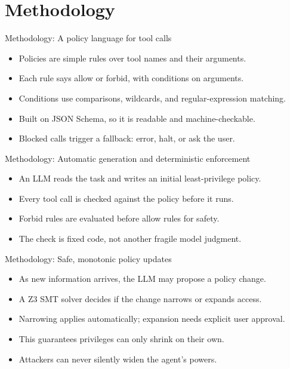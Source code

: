 \documentclass[10pt]{beamer}
\begin{document}
\section{Methodology}
\begin{frame}[allowframebreaks]{Methodology: A policy language for tool calls}
\begin{itemize}
  \item Policies are simple rules over tool names and their arguments.
  \item Each rule says allow or forbid, with conditions on arguments.
  \item Conditions use comparisons, wildcards, and regular-expression matching.
  \item Built on JSON Schema, so it is readable and machine-checkable.
  \item Blocked calls trigger a fallback: error, halt, or ask the user.
\end{itemize}
\end{frame}
\begin{frame}[allowframebreaks]{Methodology: Automatic generation and deterministic enforcement}
\begin{itemize}
  \item An LLM reads the task and writes an initial least-privilege policy.
  \item Every tool call is checked against the policy before it runs.
  \item Forbid rules are evaluated before allow rules for safety.
  \item The check is fixed code, not another fragile model judgment.
\end{itemize}
\end{frame}
\begin{frame}[allowframebreaks]{Methodology: Safe, monotonic policy updates}
\begin{itemize}
  \item As new information arrives, the LLM may propose a policy change.
  \item A Z3 SMT solver decides if the change narrows or expands access.
  \item Narrowing applies automatically; expansion needs explicit user approval.
  \item This guarantees privileges can only shrink on their own.
  \item Attackers can never silently widen the agent's powers.
\end{itemize}
\end{frame}
\end{document}
